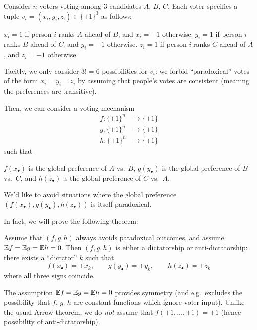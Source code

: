 Consider $n$ voters voting among $3$ candidates $A$, $B$, $C$.
Each voter specifies a tuple $v_i = (x_i, y_i, z_i) \in \{\pm1\}^3$ as follows:
\begin{itemize}
	\ii $x_i = 1$ if person $i$ ranks $A$ ahead of $B$, and $x_i = -1$ otherwise.
	\ii $y_i = 1$ if person $i$ ranks $B$ ahead of $C$, and $y_i = -1$ otherwise.
	\ii $z_i = 1$ if person $i$ ranks $C$ ahead of $A$, and $z_i = -1$ otherwise.
\end{itemize}
Tacitly, we only consider $3! = 6$ possibilities for $v_i$:
we forbid ``paradoxical'' votes of the form $x_i = y_i = z_i$
by assuming that people's votes are consistent
(meaning the preferences are transitive).

Then, we can consider a voting mechanism
\begin{align*}
	f \colon \{\pm1\}^n &\to \{\pm1\} \\
	g \colon \{\pm1\}^n &\to \{\pm1\} \\
	h \colon \{\pm1\}^n &\to \{\pm1\}
\end{align*}
such that
\begin{itemize}
	\ii $f(x_\bullet)$ is the global preference of $A$ vs.\ $B$,
	\ii $g(y_\bullet)$ is the global preference of $B$ vs.\ $C$,
	\ii and $h(z_\bullet)$ is the global preference of $C$ vs.\ $A$.
\end{itemize}
We'd like to avoid situations where the global preference
$(f(x_\bullet), g(y_\bullet), h(z_\bullet))$ is itself paradoxical.

In fact, we will prove the following theorem:
\begin{theorem}
	Assume that $(f,g,h)$ always avoids paradoxical outcomes,
	and assume $\mathbb E f = \mathbb E g = \mathbb E h = 0$.
	Then $(f,g,h)$ is either a dictatorship or anti-dictatorship:
	there exists a ``dictator'' $k$ such that
	\[ f(x_\bullet) = \pm x_k, \qquad g(y_\bullet) = \pm y_k,
		\qquad h(z_\bullet) = \pm z_k \]
	where all three signs coincide.
\end{theorem}
The assumption $\mathbb E f = \mathbb E g = \mathbb E h = 0$ provides symmetry
(and e.g.\ excludes the possibility that $f$, $g$, $h$
are constant functions which ignore voter input).
Unlike the usual Arrow theorem, we do \emph{not} assume
that $f(+1, \dots, +1) = +1$ (hence possibility of anti-dictatorship).

